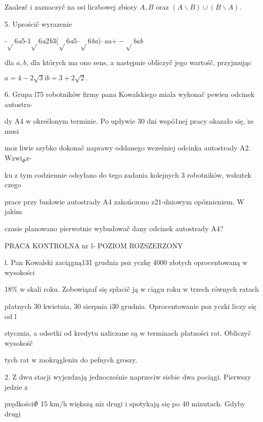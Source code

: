 \documentclass[a4paper,12pt]{article}
\begin{document}
Znalez$\acute{}$č $\mathrm{i}$ zaznaczyč na osi liczbowej zbiory $A, B$ oraz $(A\backslash B)\cup(B\backslash A).$

5. Uprościč wyrazenie

-$\sqrt{}$6{\it a}5-1$\sqrt{}$6{\it a}2{\it b}3($\sqrt{}$6{\it a}5--$\sqrt{}$6{\it ba})--{\it aa}$+-\sqrt{}${\it bab}

dla $a, b$, dla których ma ono sens, a następnie obliczyč jego wartośč, przyjmując

$a=4-2\sqrt{3}\mathrm{i} b=3+2\sqrt{2}.$

6. Grupa l75 robotników firmy pana Kowalskiego miala wykonač pewien odcinek autostra-

dy A4 $\mathrm{w}$ określonym terminie. Po upływie 30 dni wspó1nej pracy okazało się, $\dot{\mathrm{z}}\mathrm{e}$ musi

$\mathrm{m}\mathrm{o}\dot{\mathrm{z}}$ liwie szybko dokonač naprawy oddanego wcześniej odcinka autostrady A2. $\mathrm{W}\mathrm{z}\mathrm{w}\mathrm{i}_{\Phi}\mathrm{z}$-

ku $\mathrm{z}$ tym codziennie odsyłano do tego zadania kolejnych 3 robotników, wskutek czego

prace przy budowie autostrady A4 zakończono $\mathrm{z} 21$-dniowym opóznieniem. $\mathrm{W}$ jakim

czasie planowano pierwotnie wybudowač dany odcinek autostrady A4?




PRACA KONTROLNA nr l- POZIOM ROZSZERZONY

l. Pan Kowalski zaciągną131 grudnia $\mathrm{p}\mathrm{o}\dot{\mathrm{z}}$ yczkę 4000 złotych oprocentowaną $\mathrm{w}$ wysokości

18\% $\mathrm{w}$ skali roku. Zobowiązaf się splacič ją $\mathrm{w}$ ciągu roku $\mathrm{w}$ trzech równych ratach

płatnych 30 kwietnia, 30 sierpnia $\mathrm{i}30$ grudnia. Oprocentowanie $\mathrm{p}\mathrm{o}\dot{\mathrm{z}}$ yczki liczy się od l

stycznia, a odsetki od kredytu naliczane są $\mathrm{w}$ terminach płatności rat. Obliczyč wysokośč

tych rat $\mathrm{w}$ zaokrągleniu do pefnych groszy.

2. $\mathrm{Z}$ dwu stacji wyjezdzają jednocześnie naprzeciw siebie dwa pociągi. Pierwszy jedzie $\mathrm{z}$

prędkości$\Phi$ 15 $\mathrm{k}\mathrm{m}/\mathrm{h}$ większą $\mathrm{n}\mathrm{i}\dot{\mathrm{z}}$ drugi $\mathrm{i}$ spotykają się po 40 minutach. Gdyby drugi
\end{document}
